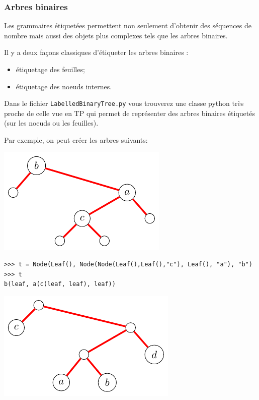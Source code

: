 \documentclass[11pt]{article}
\begin{document}
\subsubsection{Arbres binaires}
\label{seq:binary-trees}

Les grammaires étiquetées permettent non seulement d'obtenir des séquences de nombre
mais aussi des objets plus complexes tels que les arbres binaires.

Il y a deux façons classiques d'étiqueter les arbres binaires :
\begin{itemize}
\item étiquetage des feuilles;
\item étiquetage des noeuds internes.
\end{itemize}

Dans le fichier \texttt{LabelledBinaryTree.py} vous trouverez une classe python très proche
de celle vue en TP qui permet de représenter des arbres binaires étiquetés (sur les noeuds
ou les feuilles).

Par exemple, on peut créer les arbres suivants:

\includegraphics[scale=.5]{images/arbre_etiquete1.pdf}

\begin{verbatim}
>>> t = Node(Leaf(), Node(Node(Leaf(),Leaf(),"c"), Leaf(), "a"), "b")
>>> t
b(leaf, a(c(leaf, leaf), leaf))
\end{verbatim}

\includegraphics[scale=.5]{images/arbre_etiquete2.pdf}
\end{document}
